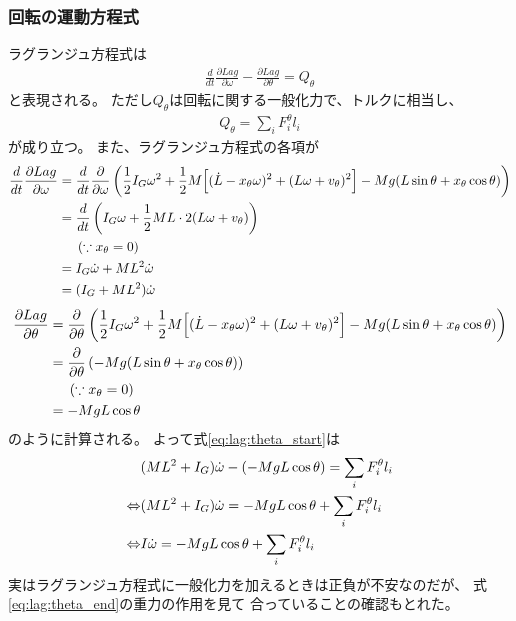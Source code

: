 \documentclass[a4paper,11pt]{jsarticle}
\begin{document}
\subsubsection*{回転の運動方程式}
ラグランジュ方程式は
\begin{align}
  \frac{d}{dt}\frac{\partial Lag}{\partial \omega} - \frac{\partial Lag}{\partial \theta} = Q_\theta
  \label{eq:lag:theta_start}
\end{align}
と表現される。
ただし$Q_\theta$は回転に関する一般化力で、トルクに相当し、
\begin{align*}
  Q_\theta = \sum_i F_i^\theta l_i
\end{align*}
が成り立つ。
また、ラグランジュ方程式の各項が
\begin{align*}
  \frac{d}{dt}\frac{\partial Lag}{\partial \omega}
  &= \frac{d}{dt}\frac{\partial }{\partial \omega}
  \left(
    \frac{1}{2}I_G\omega^2
    + \frac{1}{2}M
    \Bigl[ (\dot{L} - x_\theta \omega)^2 + (L\omega + v_\theta)^2 \Bigr]
    - Mg ( L\sin\theta + x_\theta \cos\theta )
  \right)
  \\
  &= \frac{d}{dt} \left( I_G\omega + \frac{1}{2}ML\cdot 2(L\omega + v_\theta) \right)
  \\
  & \ \ \ \ \left( \because x_\theta = 0 \right)
  \\
  &= I_G\dot\omega + ML^2\dot\omega
  \\
  &= (I_G + ML^2)\dot\omega
\end{align*}
\begin{align*}
  \frac{\partial Lag}{\partial \theta}
  &= \frac{\partial }{\partial \theta}
  \left(
    \frac{1}{2}I_G\omega^2
    + \frac{1}{2}M
    \Bigl[ (\dot{L} - x_\theta \omega)^2 + (L\omega + v_\theta)^2 \Bigr]
    - Mg ( L\sin\theta + x_\theta \cos\theta )
  \right)
  \\
  &= \frac{\partial }{\partial \theta}\left( - Mg ( L\sin\theta + x_\theta \cos\theta ) \right)
  \\
  & \ \ \ \ \left( \because x_\theta = 0 \right)
  \\
  &= -MgL\cos\theta
\end{align*}
のように計算される。
よって式\ref{eq:lag:theta_start}は
\begin{align}
  & (ML^2 + I_G)\dot\omega - ( -MgL\cos\theta ) = \sum_i F_i^\theta l_i
  \notag
  \\
  \Leftrightarrow
  & (ML^2 + I_G)\dot\omega = -MgL\cos\theta + \sum_i F_i^\theta l_i
  \notag
  \\
  \Leftrightarrow
  & I\dot\omega = -MgL\cos\theta + \sum_i F_i^\theta l_i
  \label{eq:lag:theta_end}
\end{align}
実はラグランジュ方程式に一般化力を加えるときは正負が不安なのだが、
式\ref{eq:lag:theta_end}の重力の作用を見て
合っていることの確認もとれた。
\end{document}
